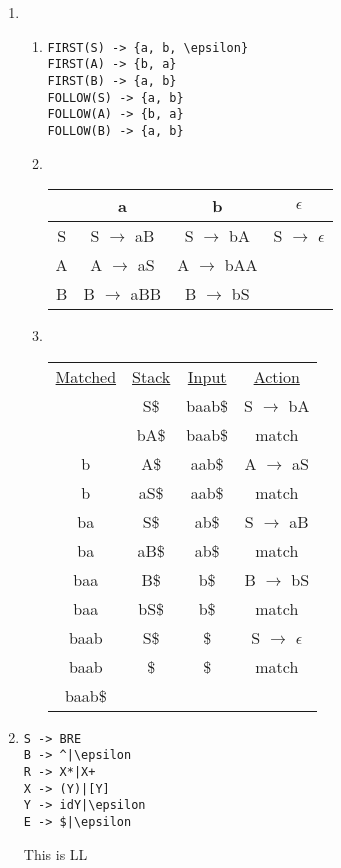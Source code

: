 \documentclass[12pt]{article}
\newcommand{\ra}{$\rightarrow$}
\begin{document}
\begin{center}
\begin{enumerate}
			\item \begin{enumerate}
				\item
				
				\begin{lstlisting}
FIRST(S) -> {a, b, \epsilon}
FIRST(A) -> {b, a}
FIRST(B) -> {a, b}
FOLLOW(S) -> {a, b}
FOLLOW(A) -> {b, a}
FOLLOW(B) -> {a, b}
				\end{lstlisting}
				
			\item ~
			
			\begin{tabular}{|c|c|c|c|}
				\hline
				& a & b & $\epsilon$ \\ \hline
				S & S \ra{} aB & S \ra{} bA & S \ra{} $\epsilon$ \\ \hline
				A & A \ra{} aS & A \ra{} bAA & \\ \hline
				B & B \ra{} aBB & B \ra{} bS & \\ \hline
			\end{tabular}
			
			\item ~
			
			\begin{tabular}{cccc}
				\underline{Matched} & \underline{Stack} & \underline{Input} & \underline{Action} \\
				& S\$ & baab\$ & S \ra{} bA \\
				& bA\$ & baab\$ & match \\
				b & A\$ & aab\$ & A \ra{} aS \\
				b & aS\$ & aab\$ & match \\
				ba & S\$ & ab\$ & S \ra{} aB \\
				ba & aB\$ & ab\$ & match \\
				baa & B\$ & b\$ & B \ra{} bS \\
				baa & bS\$ & b\$ & match \\
				baab & S\$ & \$ & S \ra{} $\epsilon$ \\
				baab & \$ & \$ & match\\
				baab\$ & & & \\
			\end{tabular}						
			
			\end{enumerate}
			
			\item \begin{lstlisting}
S -> BRE
B -> ^|\epsilon
R -> X*|X+
X -> (Y)|[Y]
Y -> idY|\epsilon
E -> $|\epsilon
			\end{lstlisting}
			
			This is LL
		\end{enumerate}
	\end{center}
\end{document}
